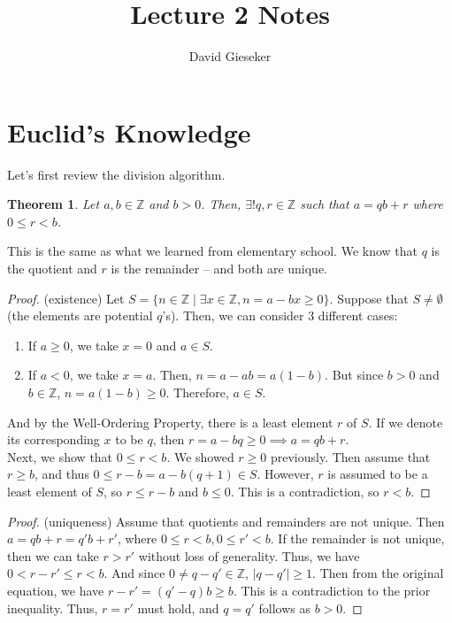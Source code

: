 \documentclass{article}
\begin{document}
\title{Lecture 2 Notes}
\author{David Gieseker}
\maketitle

\newtheorem*{theorem}{Theorem}
\newtheorem*{corollary}{Corollary}
\newtheorem*{lemma}{Lemma}
\newtheorem*{definition}{Definition}
\newtheorem*{example}{Example}

\section{Euclid's Knowledge}
Let's first review the division algorithm. 
\begin{theorem}
Let $a,b \in\mathbb{Z}$ and $b>0$. Then, $\exists! q,r\in\mathbb{Z}$ such that $a=qb+r$ where $0 \leq r<b$. 
\end{theorem}
This is the same as what we learned from elementary school. We know that $q$ is the quotient and $r$ is the remainder -- and both are unique.
\begin{proof}
(existence) Let $S=\{n\in\mathbb{Z}\mid\exists x\in\mathbb{Z}, n=a-bx\geq0\}$. Suppose that $S\neq\emptyset$ (the elements are potential $q$'s). Then, we can consider 3 different cases: 
\begin{enumerate}
	\item If $a\geq0$, we take $x=0$ and $a\in S$. 
	\item If $a<0$, we take $x=a$. Then, $n=a-ab=a(1-b)$. But since $b>0$ and $b\in\mathbb{Z}$, $n=a(1-b)\geq0$. Therefore, $a\in S$. 
\end{enumerate}
And by the Well-Ordering Property, there is a least element $r$ of $S$. If we denote its corresponding $x$ to be $q$, then $r=a-bq\geq0 \implies a=qb+r$. \\
Next, we show that $0\leq r < b$. We showed $r\geq0$ previously. Then assume that $r\geq b$, and thus $0\leq r-b = a-b(q+1)\in S$. However, $r$ is assumed to be a least element of $S$, so $r\leq r-b$ and $b\leq0$. This is a contradiction, so $r < b$.
\end{proof}
\begin{proof}
(uniqueness) Assume that quotients and remainders are not unique. Then $a=qb+r=q'b+r'$, where $0\leq r<b, 0\leq r'<b$. If the remainder is not unique, then we can take $r>r'$ without loss of generality. Thus, we have $0<r-r'\leq r<b$. And since $0\neq q-q'\in\mathbb{Z}$, $|q-q'|\geq1$. Then from the original equation, we have $r-r'=(q'-q)b\geq b$. This is a contradiction to the prior inequality. Thus, $r=r'$ must hold, and $q=q'$ follows as $b>0$. 
\end{proof}
\end{document}
